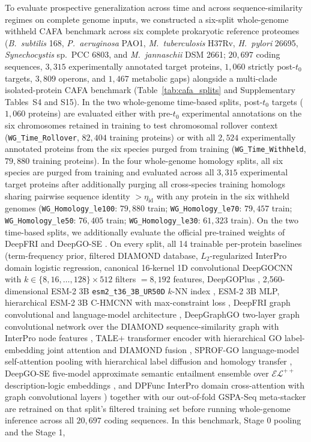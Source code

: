 \documentclass[10pt,twocolumn]{article}
\begin{document}
To evaluate prospective generalization across time and across sequence-similarity regimes on complete genome inputs, we constructed a six-split whole-genome withheld CAFA benchmark across six complete prokaryotic reference proteomes (\textit{B.~subtilis} 168, \textit{P.~aeruginosa} PAO1, \textit{M.~tuberculosis} H37Rv, \textit{H.~pylori} 26695, \textit{Synechocystis} sp.\ PCC 6803, and \textit{M.~jannaschii} DSM 2661; $20{,}697$ coding sequences, $3{,}315$ experimentally annotated target proteins, $1{,}060$ strictly post-$t_0$ targets, $3{,}809$ operons, and $1{,}467$ metabolic gaps) alongside a multi-clade isolated-protein CAFA benchmark (Table~\ref{tab:cafa_splits} and Supplementary Tables~S4 and S15). In the two whole-genome time-based splits, post-$t_0$ targets ($1{,}060$ proteins) are evaluated either with pre-$t_0$ experimental annotations on the six chromosomes retained in training to test chromosomal rollover context (\texttt{WG\_Time\_Rollover}, $82{,}404$ training proteins) or with all $2{,}524$ experimentally annotated proteins from the six species purged from training (\texttt{WG\_Time\_Withheld}, $79{,}880$ training proteins). In the four whole-genome homology splits, all six species are purged from training and evaluated across all $3{,}315$ experimental target proteins after additionally purging all cross-species training homologs sharing pairwise sequence identity $> \eta_{\text{id}}$ with any protein in the six withheld genomes (\texttt{WG\_Homology\_le100}: $79{,}880$ train; \texttt{WG\_Homology\_le70}: $79{,}457$ train; \texttt{WG\_Homology\_le50}: $76{,}405$ train; \texttt{WG\_Homology\_le30}: $61{,}323$ train). On the two time-based splits, we additionally evaluate the official pre-trained weights of DeepFRI \citep{gligorijevic2021structure} and DeepGO-SE \citep{kulmanov2024deepgose}. On every split, all 14 trainable per-protein baselines (term-frequency prior, filtered DIAMOND database, $L_2$-regularized InterPro domain logistic regression, canonical 16-kernel 1D convolutional DeepGOCNN with $k \in \{8, 16, \dots, 128\} \times 512$ filters $= 8{,}192$ features, DeepGOPlus \citep{kulmanov2020deepgoplus}, 2,560-dimensional ESM-2 3B \texttt{esm2\_t36\_3B\_UR50D} $k$-NN index \citep{littmann2021embeddings}, ESM-2 3B MLP, hierarchical ESM-2 3B C-HMCNN with max-constraint loss \citep{giunchiglia2020coherent}, DeepFRI graph convolutional and language-model architecture \citep{gligorijevic2021structure}, DeepGraphGO two-layer graph convolutional network over the DIAMOND sequence-similarity graph with InterPro node features \citep{you2021deepgraphgo}, TALE+ transformer encoder with hierarchical GO label-embedding joint attention and DIAMOND fusion \citep{cao2021tale}, SPROF-GO language-model self-attention pooling with hierarchical label diffusion and homology transfer \citep{yuan2023fast}, DeepGO-SE five-model approximate semantic entailment ensemble over $\mathcal{EL}^{++}$ description-logic embeddings \citep{kulmanov2024deepgose}, and DPFunc InterPro domain cross-attention with graph convolutional layers \citep{ding2025dpfunc}) together with our out-of-fold GSPA-Seq meta-stacker are retrained on that split's filtered training set before running whole-genome inference across all $20{,}697$ coding sequences. In this benchmark, Stage 0 pooling and the Stage 1, 
\end{document}
